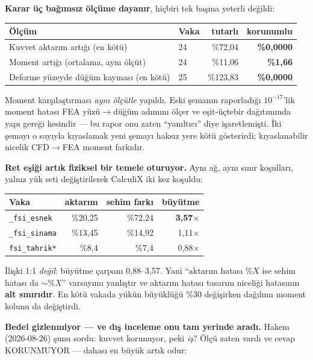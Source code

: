 \documentclass[11pt,a4paper]{article}
\begin{document}
\textbf{Karar üç bağımsız ölçüme dayanır}, hiçbiri tek başına yeterli değildi:

\begin{center}\footnotesize
\begin{tabular}{@{}llrr@{}}
\toprule
Ölçüm & Vaka & tutarlı & korunumlu \\
\midrule
Kuvvet aktarım artığı (en kötü) & 24 & \%72{,}04 & \textbf{\%0{,}0000} \\
Moment artığı (ortalama, aynı ölçüt) & 24 & \%11{,}06 & \textbf{\%1{,}66} \\
Deforme yüzeyde düğüm kayması (en kötü) & 25 & \%123{,}83 & \textbf{\%0{,}0000} \\
\bottomrule
\end{tabular}
\end{center}

\noindent Moment karşılaştırması \emph{aynı ölçütle} yapıldı. Eski şemanın
raporladığı $10^{-17}$'lik moment hatası FEA yüzü$\rightarrow$düğüm adımını
ölçer ve eşit-üçtebir dağıtımında yapı gereği kesindir --- bu rapor onu zaten
``yanıltıcı'' diye işaretlemişti. İki şemayı o sayıyla kıyaslamak yeni şemayı
haksız yere kötü gösterirdi; kıyaslanabilir nicelik CFD$\rightarrow$FEA moment
farkıdır.

\textbf{Ret eşiği artık fiziksel bir temele oturuyor.} Aynı ağ, aynı sınır
koşulları, yalnız yük seti değiştirilerek CalculiX iki kez koşuldu:

\begin{center}\footnotesize
\begin{tabular}{@{}lrrr@{}}
\toprule
Vaka & aktarım & sehim farkı & büyütme \\
\midrule
\texttt{\_fsi\_esnek}  & \%20{,}25 & \%72{,}24 & \textbf{3{,}57$\times$} \\
\texttt{\_fsi\_sinama} & \%13{,}45 & \%14{,}92 & 1{,}11$\times$ \\
\texttt{fsi\_tahrik*}  & \phantom{0}\%8{,}4 & \phantom{0}\%7{,}4 & 0{,}88$\times$ \\
\bottomrule
\end{tabular}
\end{center}

\noindent İlişki 1:1 \emph{değil}: büyütme çarpanı 0{,}88--3{,}57. Yani
``aktarım hatası \%$X$ ise sehim hatası da $\sim$\%$X$'' varsayımı yanlıştır ve
aktarım hatası tasarım niceliği hatasının \textbf{alt sınırıdır}. En kötü
vakada yükün büyüklüğü \%30 değişirken dağılımı moment kolunu da değiştirdi.

\textbf{Bedel gizlenmiyor --- ve dış inceleme onu tam yerinde aradı.}
Hakem (2026-08-26) şunu sordu: kuvvet korunuyor, peki \emph{iş}? Ölçü
zaten vardı ve cevap KORUNMUYOR --- dahası en büyük artık odur:
\end{document}
